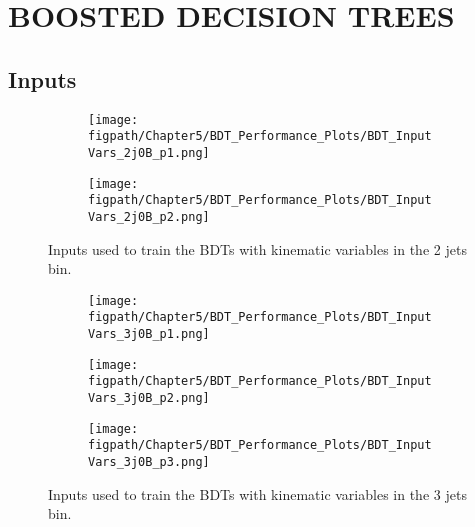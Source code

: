 %
%
%
%


\chapter{\texorpdfstring{\uppercase{Boosted Decision Trees}}{Boosted Decision Trees}}

\section{Inputs}
\label{appendix:BDT_Inputs}

\begin{figure}[!hbt]
    \centering
    \begin{subfigure}[t]{0.93\textwidth}
        \texttt{[image: \\figpath/Chapter5/BDT\_Performance\_Plots/BDT\_InputVars\_2j0B\_p1.png]}
        \caption{}
        \label{fig:BDT_InputVars_2j0B_p1}
    \end{subfigure}

    \begin{subfigure}[t]{0.93\textwidth}
        \texttt{[image: \\figpath/Chapter5/BDT\_Performance\_Plots/BDT\_InputVars\_2j0B\_p2.png]}
        \caption{}
        \label{fig:BDT_InputVars_2j0B_p2}
    \end{subfigure}
    \caption{Inputs used to train the BDTs with kinematic variables in the 2 jets bin.}
    \label{fig:BDT_InputVars_2j0B}
\end{figure}

\begin{figure}[!hbt]
    \centering
    \begin{subfigure}[t]{0.93\textwidth}
        \texttt{[image: \\figpath/Chapter5/BDT\_Performance\_Plots/BDT\_InputVars\_3j0B\_p1.png]}
        \caption{}
        \label{fig:BDT_InputVars_3j0B_p1}
    \end{subfigure}

    \begin{subfigure}[t]{0.93\textwidth}
        \texttt{[image: \\figpath/Chapter5/BDT\_Performance\_Plots/BDT\_InputVars\_3j0B\_p2.png]}
        \caption{}
        \label{fig:BDT_InputVars_3j0B_p2}
    \end{subfigure}

    \begin{subfigure}[t]{0.93\textwidth}
        \texttt{[image: \\figpath/Chapter5/BDT\_Performance\_Plots/BDT\_InputVars\_3j0B\_p3.png]}
        \caption{}
        \label{fig:BDT_InputVars_3j0B_p3}
    \end{subfigure}
    \caption{Inputs used to train the BDTs with kinematic variables in the 3 jets bin.}
    \label{fig:BDT_InputVars_3j0B}
\end{figure}

